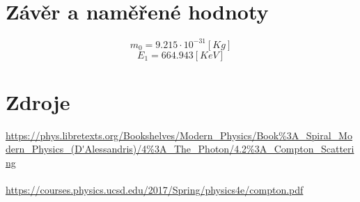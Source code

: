\documentclass{article}
\begin{document}
\section{Závěr a naměřené hodnoty}
$$m_{0} = 9.215 \cdot 10^{-31} [Kg]$$
$$E_{1} = 664.943 [KeV]$$
\section{Zdroje}
\url{https://phys.libretexts.org/Bookshelves/Modern_Physics/Book%3A_Spiral_Modern_Physics_(D'Alessandris)/4%3A_The_Photon/4.2%3A_Compton_Scattering}\\\\
\url{https://courses.physics.ucsd.edu/2017/Spring/physics4e/compton.pdf}
\end{document}
